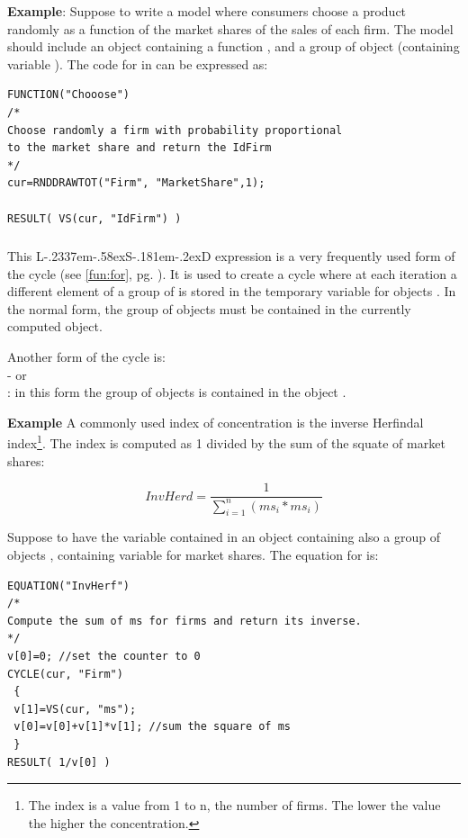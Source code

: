 \documentclass [11pt,a4paper] {book}
\def\LsD{{L\kern-.2337em\lower-.58ex\hbox{S}\kern-.181em\lower-.2ex\hbox{D}}\xspace}
\begin{document}
\textbf{Example}: Suppose to write a model where consumers choose a product randomly as a
function of the market shares of the sales of each firm. The model should include an object  containing a
function , and a group of object  (containing variable ).
The code for  in  can be expressed as:


 \small
\begin{verbatim}
FUNCTION("Chooose")
/*
Choose randomly a firm with probability proportional
to the market share and return the IdFirm
*/
cur=RNDDRAWTOT("Firm", "MarketShare",1);

RESULT( VS(cur, "IdFirm") )
\end{verbatim}
\normalsize


\subsubsection{ }
This \LsD expression is a very frequently used form of the  cycle (see
\ref{fun:for}, pg. \pageref{fun:for}). It is used to create a cycle where at each
iteration a different element of a group of  is stored in the temporary
variable for objects . In the normal form, the group of objects must be
contained in the currently computed object.

Another form of the cycle is:\\
-  or\\
: in this
form the group of objects  is contained in the object .

\textbf{Example} A commonly used index of concentration is the inverse Herfindal index\footnote{The index is a value
from 1 to n, the number of firms. The lower the value the higher the concentration.}.
The index is computed as 1 divided by the sum of the squate of market shares:

$$ InvHerd = \frac{1}{\displaystyle\sum_{i=1}^{n}(ms_i*ms_i)} $$

Suppose to have the variable  contained in an object containing also a
group of objects , containing variable  for market shares. The equation
for  is:

 \small
\begin{verbatim}
EQUATION("InvHerf")
/*
Compute the sum of ms for firms and return its inverse.
*/
v[0]=0; //set the counter to 0
CYCLE(cur, "Firm")
 {
 v[1]=VS(cur, "ms");
 v[0]=v[0]+v[1]*v[1]; //sum the square of ms
 }
RESULT( 1/v[0] )
\end{verbatim}
\normalsize
\end{document}
